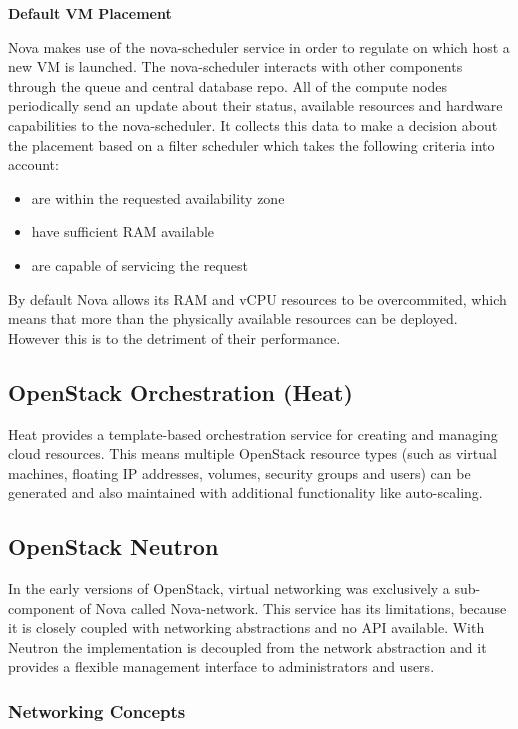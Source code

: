 \textbf{Default VM Placement}

Nova makes use of the nova-scheduler service in order to regulate on which host a new VM is launched. The nova-scheduler interacts with other components through the queue and central database repo. All of the compute nodes periodically send an update about their status,  available resources and hardware capabilities to the nova-scheduler. It collects this data to make a decision about the placement based on a filter scheduler which takes the following criteria into account:
\begin{itemize}
\item are within the requested availability zone
\item have sufficient RAM available
\item are capable of servicing the request
\end{itemize}
By default Nova allows its RAM and vCPU resources to be overcommited, which means that more than the physically available resources can be deployed. However this is to the detriment of their performance.

\subsection{OpenStack Orchestration (Heat)}

Heat provides a template-based orchestration service for creating and managing cloud resources. This means multiple OpenStack resource types (such as virtual machines, floating IP addresses, volumes, security groups and users) can be generated and also maintained with additional functionality like auto-scaling.


\subsection{OpenStack Neutron}

In the early versions of OpenStack, virtual networking was exclusively a sub-component of Nova called Nova-network. This service has its limitations, because it is closely coupled with networking abstractions and no API available. With Neutron the implementation is decoupled from the network abstraction and it provides a flexible management interface to administrators and users.


\subsubsection{Networking Concepts}

